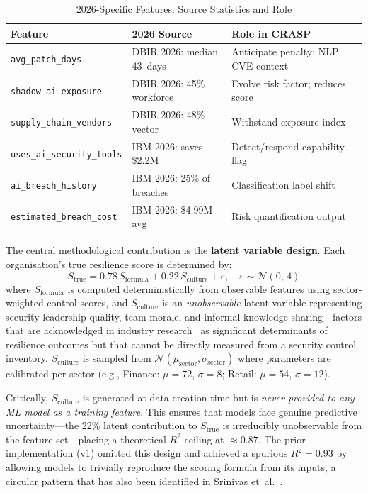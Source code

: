 \documentclass[journal]{IEEEtran}
\begin{document}
\begin{table}[!t]
\renewcommand{\arraystretch}{1.3}
\caption{2026-Specific Features: Source Statistics and Role}
\label{tab:features}
\centering
\small
\begin{tabular}{p{2.1cm}p{2.2cm}p{3.0cm}}
\toprule
\textbf{Feature} & \textbf{2026 Source} & \textbf{Role in CRASP} \\
\midrule
\texttt{avg\_patch\_days} & DBIR 2026: median 43~days & Anticipate penalty; NLP CVE context \\
\texttt{shadow\_ai\_exposure} & DBIR 2026: 45\% workforce & Evolve risk factor; reduces score \\
\texttt{supply\_chain\_vendors} & DBIR 2026: 48\% vector & Withstand exposure index \\
\texttt{uses\_ai\_security\_tools} & IBM 2026: saves \$2.2M & Detect/respond capability flag \\
\texttt{ai\_breach\_history} & IBM 2026: 25\% of breaches & Classification label shift \\
\texttt{estimated\_breach\_cost} & IBM 2026: \$4.99M avg & Risk quantification output \\
\bottomrule
\end{tabular}
\end{table}

The central methodological contribution is the \textbf{latent variable
design}. Each organisation's true resilience score is determined by:
\begin{equation}
  S_{\text{true}} = 0.78\,S_{\text{formula}} + 0.22\,S_{\text{culture}}
                    + \varepsilon, \quad \varepsilon \sim \mathcal{N}(0,\,4)
  \label{eq:latent}
\end{equation}
where $S_{\text{formula}}$ is computed deterministically from observable
features using sector-weighted control scores, and $S_{\text{culture}}$ is an
\emph{unobservable} latent variable representing security leadership quality,
team morale, and informal knowledge sharing---factors that are acknowledged
in industry research~\cite{verizon2026} as significant determinants of
resilience outcomes but that cannot be directly measured from a security
control inventory. $S_{\text{culture}}$ is sampled from
$\mathcal{N}(\mu_\text{sector}, \sigma_\text{sector})$ where parameters are
calibrated per sector (e.g., Finance: $\mu=72$, $\sigma=8$; Retail:
$\mu=54$, $\sigma=12$).

Critically, $S_{\text{culture}}$ is generated at data-creation time but is
\emph{never provided to any ML model as a training feature}. This ensures
that models face genuine predictive uncertainty---the 22\% latent contribution
to $S_{\text{true}}$ is irreducibly unobservable from the feature set---placing
a theoretical $R^2$ ceiling at $\approx 0.87$. The prior implementation (v1)
omitted this design and achieved a spurious $R^2 = 0.93$ by allowing models
to trivially reproduce the scoring formula from its inputs, a circular pattern
that has also been identified in Srinivas et~al.~\cite{srinivas2019}.
\end{document}
